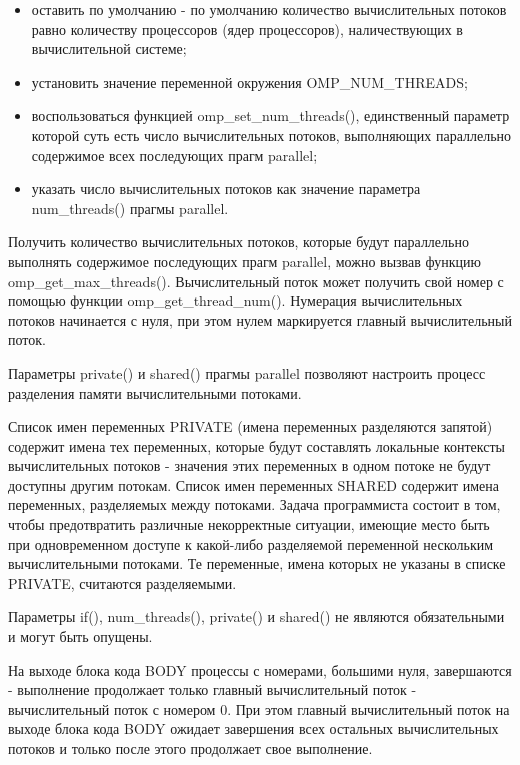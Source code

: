 \begin{itemize}

	\item оставить по умолчанию - по умолчанию количество вычислительных потоков равно количеству процессоров (ядер процессоров), наличествующих в вычислительной системе;
	\item установить значение переменной окружения \linebreak OMP\_NUM\_THREADS;
	\item воспользоваться функцией omp\_set\_num\_threads(), единственный параметр которой суть есть число вычислительных потоков, выполняющих параллельно содержимое всех последующих прагм parallel;
	\item указать число вычислительных потоков как значение параметра num\_threads() прагмы parallel.

\end{itemize}

Получить количество вычислительных потоков, которые будут параллельно выполнять содержимое последующих прагм parallel, можно вызвав функцию omp\_get\_max\_threads(). Вычислительный поток может получить свой номер с помощью функции \linebreak omp\_get\_thread\_num(). Нумерация вычислительных потоков начинается с нуля, при этом нулем маркируется главный вычислительный поток.

Параметры private() и shared() прагмы parallel позволяют настроить процесс разделения памяти вычислительными потоками.

Список имен переменных PRIVATE (имена переменных разделяются запятой) содержит имена тех переменных, которые будут составлять локальные контексты вычислительных потоков - значения этих переменных в одном потоке не будут доступны другим потокам. Список имен переменных SHARED содержит имена переменных, разделяемых между потоками. Задача программиста состоит в том, чтобы предотвратить различные некорректные ситуации, имеющие место быть при одновременном доступе к какой-либо разделяемой переменной нескольким вычислительными потоками. Те переменные, имена которых не указаны в списке PRIVATE, считаются разделяемыми.

Параметры if(), num\_threads(), private() и shared() не являются обязательными и могут быть опущены.

На выходе блока кода BODY процессы с номерами, большими нуля, завершаются - выполнение продолжает только главный вычислительный поток - вычислительный поток с номером 0. При этом главный вычислительный поток на выходе блока кода BODY ожидает завершения всех остальных вычислительных потоков и только после этого продолжает свое выполнение.


